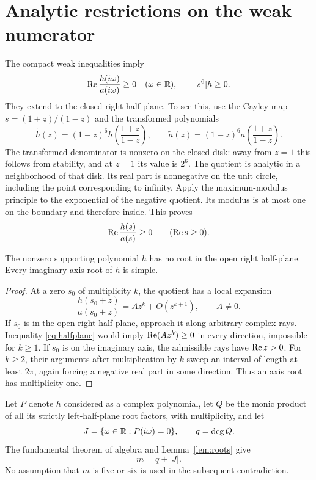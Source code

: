 \documentclass[11pt]{article}
\begin{document}
\section{Analytic restrictions on the weak numerator}
The compact weak inequalities imply
\begin{equation}\label{eq:weak}
 \operatorname{Re}\frac{h(i\omega)}{a(i\omega)}\ge0\quad(\omega\in\mathbb R),\qquad [s^6]h\ge0.
\end{equation}
They extend to the closed right half-plane. To see this, use the Cayley map $s=(1+z)/(1-z)$ and the transformed polynomials
\[
 \widetilde h(z)=(1-z)^6h\!\left(\frac{1+z}{1-z}\right),\qquad
 \widetilde a(z)=(1-z)^6a\!\left(\frac{1+z}{1-z}\right).
\]
The transformed denominator is nonzero on the closed disk: away from $z=1$ this follows from stability, and at $z=1$ its value is $2^6$. The quotient is analytic in a neighborhood of that disk. Its real part is nonnegative on the unit circle, including the point corresponding to infinity. Apply the maximum-modulus principle to the exponential of the negative quotient. Its modulus is at most one on the boundary and therefore inside. This proves
\begin{equation}\label{eq:halfplane}
 \operatorname{Re}\frac{h(s)}{a(s)}\ge0\qquad(\operatorname{Re} s\ge0).
\end{equation}

\begin{lemma}\label{lem:roots}
The nonzero supporting polynomial $h$ has no root in the open right half-plane. Every imaginary-axis root of $h$ is simple.
\end{lemma}
\begin{proof}
At a zero $s_0$ of multiplicity $k$, the quotient has a local expansion
\[
 \frac{h(s_0+z)}{a(s_0+z)}=Az^k+O(z^{k+1}),\qquad A\ne0.
\]
If $s_0$ is in the open right half-plane, approach it along arbitrary complex rays. Inequality \eqref{eq:halfplane} would imply $\operatorname{Re}(Az^k)\ge0$ in every direction, impossible for $k\ge1$. If $s_0$ is on the imaginary axis, the admissible rays have $\operatorname{Re} z>0$. For $k\ge2$, their arguments after multiplication by $k$ sweep an interval of length at least $2\pi$, again forcing a negative real part in some direction. Thus an axis root has multiplicity one.
\end{proof}

Let $P$ denote $h$ considered as a complex polynomial, let $Q$ be the monic product of all its strictly left-half-plane root factors, with multiplicity, and let
\[
 J=\{\omega\in\mathbb R:P(i\omega)=0\},\qquad q=\deg Q.
\]
The fundamental theorem of algebra and Lemma~\ref{lem:roots} give
\begin{equation}\label{eq:split}
 m=q+|J|.
\end{equation}
No assumption that $m$ is five or six is used in the subsequent contradiction.
\end{document}
